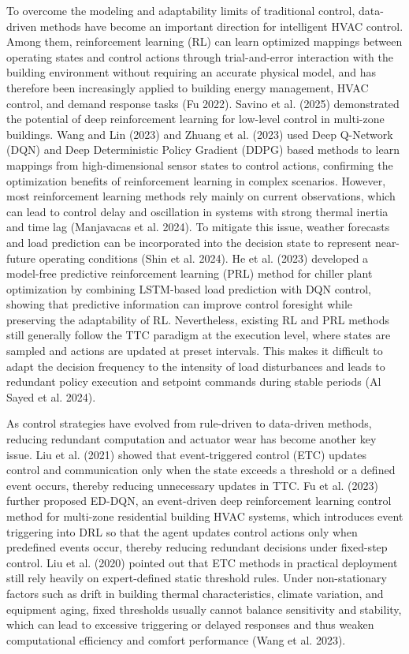 \documentclass[preprint,12pt]{elsarticle}
\begin{document}
To overcome the modeling and adaptability limits of traditional control, data-driven methods have become an important direction for intelligent HVAC control. Among them, reinforcement learning (RL) can learn optimized mappings between operating states and control actions through trial-and-error interaction with the building environment without requiring an accurate physical model, and has therefore been increasingly applied to building energy management, HVAC control, and demand response tasks (Fu 2022). Savino et al. (2025) demonstrated the potential of deep reinforcement learning for low-level control in multi-zone buildings. Wang and Lin (2023) and Zhuang et al. (2023) used Deep Q-Network (DQN) and Deep Deterministic Policy Gradient (DDPG) based methods to learn mappings from high-dimensional sensor states to control actions, confirming the optimization benefits of reinforcement learning in complex scenarios. However, most reinforcement learning methods rely mainly on current observations, which can lead to control delay and oscillation in systems with strong thermal inertia and time lag (Manjavacas et al. 2024). To mitigate this issue, weather forecasts and load prediction can be incorporated into the decision state to represent near-future operating conditions (Shin et al. 2024). He et al. (2023) developed a model-free predictive reinforcement learning (PRL) method for chiller plant optimization by combining LSTM-based load prediction with DQN control, showing that predictive information can improve control foresight while preserving the adaptability of RL. Nevertheless, existing RL and PRL methods still generally follow the TTC paradigm at the execution level, where states are sampled and actions are updated at preset intervals. This makes it difficult to adapt the decision frequency to the intensity of load disturbances and leads to redundant policy execution and setpoint commands during stable periods (Al Sayed et al. 2024).

As control strategies have evolved from rule-driven to data-driven methods, reducing redundant computation and actuator wear has become another key issue. Liu et al. (2021) showed that event-triggered control (ETC) updates control and communication only when the state exceeds a threshold or a defined event occurs, thereby reducing unnecessary updates in TTC. Fu et al. (2023) further proposed ED-DQN, an event-driven deep reinforcement learning control method for multi-zone residential building HVAC systems, which introduces event triggering into DRL so that the agent updates control actions only when predefined events occur, thereby reducing redundant decisions under fixed-step control. Liu et al. (2020) pointed out that ETC methods in practical deployment still rely heavily on expert-defined static threshold rules. Under non-stationary factors such as drift in building thermal characteristics, climate variation, and equipment aging, fixed thresholds usually cannot balance sensitivity and stability, which can lead to excessive triggering or delayed responses and thus weaken computational efficiency and comfort performance (Wang et al. 2023).
\end{document}
